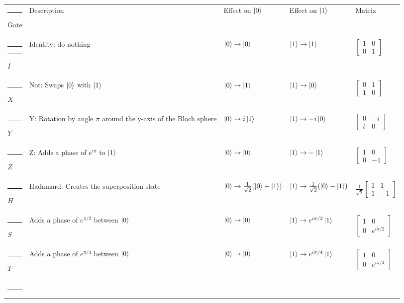 \documentclass{book}
\begin{document}
\begin{center}
\begin{tabular}{||m{1cm}| m{5cm} | m{3cm} | m{3cm} | m{2cm}||} 
 \hrule
 Gate & Description & Effect on $\ket{0}$ & Effect on $\ket{1}$ & Matrix \\ [0.5ex] 
 \hrule\hrule
 $I$ & Identity: do nothing & $\ket{0} \rightarrow  \ket{0} $ & $\ket{1} \rightarrow \ket{1}$ & $\begin{bmatrix} 1 & 0 \\ 0 & 1 \end{bmatrix}$ \\ 
 \hrule
 $X$ & Not: Swaps $\ket{0}$ with $\ket{1}$   &$\ket{0} \rightarrow \ket{1}$ &$\ket{1} \rightarrow  \ket{0}$ & $\begin{bmatrix} 0 & 1 \\ 1 & 0 \end{bmatrix}$ \\
 \hrule
 $Y$ & Y: Rotation by angle $\pi$ around the y-axis of the Bloch sphere & $\ket{0} \rightarrow  i\ket{1} $ & $\ket{1} \rightarrow -i\ket{0} $ & $\begin{bmatrix} 0 & -i \\ i & 0 \end{bmatrix}$ \\
 \hrule
 $Z$ & Z: Adds a phase of $e^{i\pi}$ to $\ket{1}$&$\ket{0} \rightarrow \ket{0}$&$\ket{1} \rightarrow -\ket{1}$ &$\begin{bmatrix} 1 & 0 \\ 0 & -1 \end{bmatrix}$  \\
 \hrule
 $H$ & Hadamard: Creates the superposition state & $\ket{0} \rightarrow \frac{1}{\sqrt{2}} ( \ket{0} + \ket{1})$ & $\ket{1} \rightarrow \frac{1}{\sqrt{2}} ( \ket{0} - \ket{1})$ & $\frac{1}{\sqrt{2}}\begin{bmatrix} 1 & 1 \\ 1 & -1 \end{bmatrix} $\\
 \hrule
 $S$ & Adds a phase of $e^{\pi/2}$ between $\ket{0}$ &$\ket{0} \rightarrow  \ket{0} $ &$\ket{1} \rightarrow e^{i\pi/2}\ket{1}$  & $\begin{bmatrix} 1 & 0 \\ 0 & e^{i\pi/2} \end{bmatrix}$\\
 \hrule
 $T$ & Adds a phase of $e^{\pi/4}$ between $\ket{0}$ &  $\ket{0} \rightarrow  \ket{0} $& $\ket{1} \rightarrow e^{i\pi/4}\ket{1}$ & $\begin{bmatrix} 1 & 0 \\ 0 & e^{i\pi/4} \end{bmatrix}$\\ [1ex] 
 \hrule
\end{tabular}
\end{center}
\end{document}
